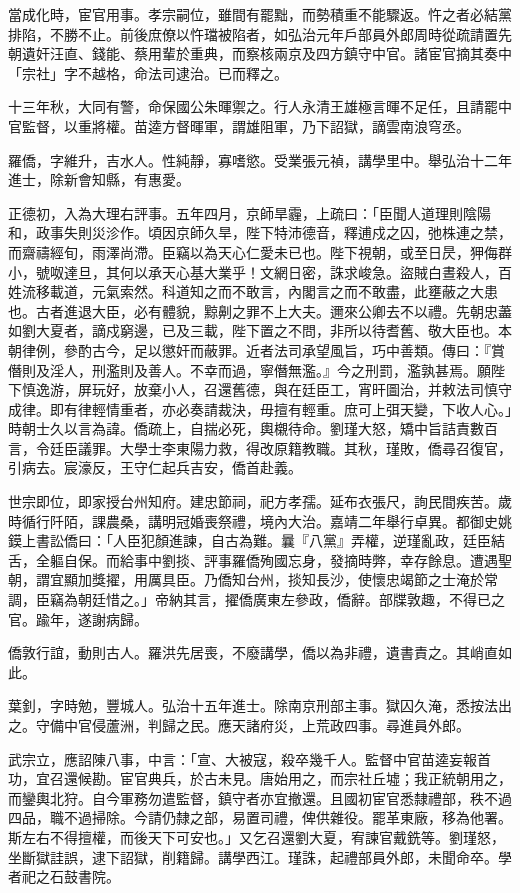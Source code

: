 \begin{pinyinscope}
當成化時，宦官用事。孝宗嗣位，雖間有罷黜，而勢積重不能驟返。忤之者必結黨排陷，不勝不止。前後庶僚以忤璫被陷者，如弘治元年戶部員外郎周時從疏請置先朝遺奸汪直、錢能、蔡用輩於重典，而察核兩京及四方鎮守中官。諸宦官摘其奏中「宗社」字不越格，命法司逮治。已而釋之。

十三年秋，大同有警，命保國公朱暉禦之。行人永清王雄極言暉不足任，且請罷中官監督，以重將權。苗逵方督暉軍，謂雄阻軍，乃下詔獄，謫雲南浪穹丞。

羅僑，字維升，吉水人。性純靜，寡嗜慾。受業張元禎，講學里中。舉弘治十二年進士，除新會知縣，有惠愛。

正德初，入為大理右評事。五年四月，京師旱霾，上疏曰：「臣聞人道理則陰陽和，政事失則災沴作。頃因京師久旱，陛下特沛德音，釋逋戍之囚，弛株連之禁，而齋禱經旬，雨澤尚滯。臣竊以為天心仁愛未已也。陛下視朝，或至日昃，狎侮群小，號呶達旦，其何以承天心基大業乎！文網日密，誅求峻急。盜賊白晝殺人，百姓流移載道，元氣索然。科道知之而不敢言，內閣言之而不敢盡，此壅蔽之大患也。古者進退大臣，必有體貌，黥劓之罪不上大夫。邇來公卿去不以禮。先朝忠藎如劉大夏者，謫戍窮邊，已及三載，陛下置之不問，非所以待耆舊、敬大臣也。本朝律例，參酌古今，足以懲奸而蔽罪。近者法司承望風旨，巧中善類。傳曰：『賞僭則及淫人，刑濫則及善人。不幸而過，寧僭無濫。』今之刑罰，濫孰甚焉。願陛下慎逸游，屏玩好，放棄小人，召還舊德，與在廷臣工，宵旰圖治，并敕法司慎守成律。即有律輕情重者，亦必奏請裁決，毋擅有輕重。庶可上弭天變，下收人心。」時朝士久以言為諱。僑疏上，自揣必死，輿櫬待命。劉瑾大怒，矯中旨詰責數百言，令廷臣議罪。大學士李東陽力救，得改原籍教職。其秋，瑾敗，僑尋召復官，引病去。宸濠反，王守仁起兵吉安，僑首赴義。

世宗即位，即家授台州知府。建忠節祠，祀方孝孺。延布衣張尺，詢民間疾苦。歲時循行阡陌，課農桑，講明冠婚喪祭禮，境內大治。嘉靖二年舉行卓異。都御史姚鏌上書訟僑曰：「人臣犯顏進諫，自古為難。曩『八黨』弄權，逆瑾亂政，廷臣結舌，全軀自保。而給事中劉掞、評事羅僑殉國忘身，發摘時弊，幸存餘息。遭遇聖朝，謂宜顯加獎擢，用厲具臣。乃僑知台州，掞知長沙，使懷忠竭節之士淹於常調，臣竊為朝廷惜之。」帝納其言，擢僑廣東左參政，僑辭。部牒敦趣，不得已之官。踰年，遂謝病歸。

僑敦行誼，動則古人。羅洪先居喪，不廢講學，僑以為非禮，遺書責之。其峭直如此。

葉釗，字時勉，豐城人。弘治十五年進士。除南京刑部主事。獄囚久淹，悉按法出之。守備中官侵蘆洲，判歸之民。應天諸府災，上荒政四事。尋進員外郎。

武宗立，應詔陳八事，中言：「宣、大被寇，殺卒幾千人。監督中官苗逵妄報首功，宜召還候勘。宦官典兵，於古未見。唐始用之，而宗社丘墟；我正統朝用之，而鑾輿北狩。自今軍務勿遣監督，鎮守者亦宜撤還。且國初宦官悉隸禮部，秩不過四品，職不過掃除。今請仍隸之部，易置司禮，俾供雜役。罷革東廠，移為他署。斯左右不得擅權，而後天下可安也。」又乞召還劉大夏，宥諫官戴銑等。劉瑾怒，坐斷獄詿誤，逮下詔獄，削籍歸。講學西江。瑾誅，起禮部員外郎，未聞命卒。學者祀之石鼓書院。


\end{pinyinscope}
